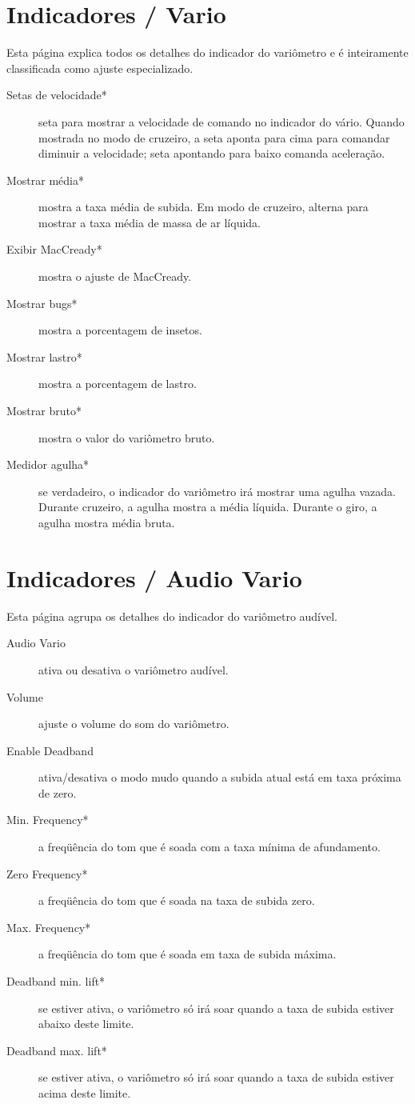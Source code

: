\section{Indicadores / Vario}\label{sec:vario-gauge}

Esta página explica todos os detalhes do indicador do variômetro e é inteiramente classificada como ajuste especializado.

\begin{description}
\item[Setas de velocidade*]  \label{conf:variogauge} seta para mostrar a velocidade de comando no indicador do vário.  Quando mostrada no modo de cruzeiro, a seta aponta para cima para comandar diminuir a velocidade; seta apontando para baixo comanda aceleração.
\item[Mostrar média*]  mostra a taxa média de subida.  Em modo de cruzeiro, alterna para mostrar a taxa média de massa de ar líquida.
\item[Exibir MacCready*]  mostra o ajuste de MacCready.
\item[Mostrar  bugs*]  mostra a porcentagem de insetos.
\item[Mostrar lastro*] mostra a porcentagem de lastro.
\item[Mostrar bruto*]  mostra o valor do variômetro bruto.
\item[Medidor agulha*] se verdadeiro, o indicador do variômetro irá mostrar uma agulha vazada.  
Durante cruzeiro, a agulha mostra a média líquida.
Durante o giro, a agulha mostra média bruta.

\end{description}

\section{Indicadores / Audio Vario}\label{sec:audiovario-gauge}

Esta página agrupa os detalhes do indicador do variômetro audível. \label{conf:audiovariogauge}

\begin{description}
\item[Audio Vario]  ativa ou desativa o variômetro audível.
\item[Volume]  ajuste o volume do som do variômetro.
\item[Enable Deadband]  ativa/desativa o modo mudo quando a subida atual está em taxa próxima de zero.
\item[Min. Frequency*]  a freqüência do tom que é soada com a taxa mínima de afundamento.
\item[Zero Frequency*]  a freqüência do tom que é soada na taxa de subida zero.
\item[Max. Frequency*]  a freqüência do tom que é soada em taxa de subida máxima.
\item[Deadband min. lift*]  se estiver ativa, o variômetro só irá soar quando a taxa de subida estiver abaixo deste limite.
\item[Deadband max. lift*]  se estiver ativa, o variômetro só irá soar quando a taxa de subida estiver acima deste limite.
\end{description}


